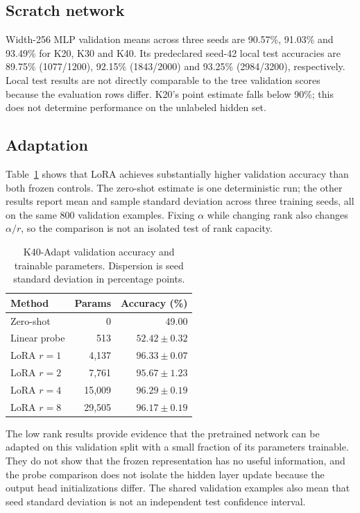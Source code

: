 \documentclass{article}
\begin{document}
\subsection{Scratch network}
Width-256 MLP validation means across three seeds are 90.57\%, 91.03\% and 93.49\% for K20, K30 and K40. Its predeclared seed-42 local test accuracies are 89.75\% (1077/1200), 92.15\% (1843/2000) and 93.25\% (2984/3200), respectively. Local test results are not directly comparable to the tree validation scores because the evaluation rows differ. K20's point estimate falls below 90\%; this does not determine performance on the unlabeled hidden set.

\subsection{Adaptation}
Table~\ref{tab:adapt} shows that LoRA achieves substantially higher validation accuracy than both frozen controls. The zero-shot estimate is one deterministic run; the other results report mean and sample standard deviation across three training seeds, all on the same 800 validation examples. Fixing $\alpha$ while changing rank also changes $\alpha/r$, so the comparison is not an isolated test of rank capacity.
\begin{table}[t]
\caption{K40-Adapt validation accuracy and trainable parameters. Dispersion is seed standard deviation in percentage points.}
\label{tab:adapt}
\centering
\begin{tabular}{lrr}\toprule
Method & Params & Accuracy (\%) \\\midrule
Zero-shot & 0 & 49.00 \\
Linear probe & 513 & $52.42\pm0.32$ \\
LoRA $r=1$ & 4,137 & $96.33\pm0.07$ \\
LoRA $r=2$ & 7,761 & $95.67\pm1.23$ \\
LoRA $r=4$ & 15,009 & $96.29\pm0.19$ \\
LoRA $r=8$ & 29,505 & $96.17\pm0.19$ \\\bottomrule
\end{tabular}
\end{table}

The low rank results provide evidence that the pretrained network can be adapted on this validation split with a small fraction of its parameters trainable. They do not show that the frozen representation has no useful information, and the probe comparison does not isolate the hidden layer update because the output head initializations differ. The shared validation examples also mean that seed standard deviation is not an independent test confidence interval.
\end{document}
